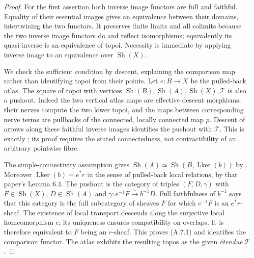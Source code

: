 \begin{proof}
For the first assertion both inverse image functors are full and
faithful. Equality of their essential images gives an equivalence
between their domains, intertwining the two functors. It preserves
finite limits and all colimits because the two inverse image functors
do and reflect isomorphisms; equivalently its quasi-inverse is an
equivalence of topoi. Necessity is immediate by applying inverse
image to an equivalence over $\operatorname{Sh}(X)$.

We check the sufficient condition by descent, explaining the comparison
map rather than identifying topoi from their points. Let $e:B\to X$
be the pulled-back atlas. The square of topoi with vertices
$\operatorname{Sh}(B),\operatorname{Sh}(A),\operatorname{Sh}(X),
\mathcal T$ is also a pushout. Indeed the two vertical atlas maps
are effective descent morphisms; their nerves compute the two lower
topoi, and the maps between corresponding nerve terms are pullbacks
of the connected, locally connected map $p$. Descent of arrows along
these faithful inverse images identifies the pushout with $\mathcal T$.
This is exactly \cite[Lemma 7.2, using Lemma 3.5]{KockMoerdijk1992};
its proof requires the stated connectedness, not contractibility of
an arbitrary pointwise fibre.

The simple-connectivity assumption gives
$\operatorname{Sh}(A)\simeq
\operatorname{Sh}(B,\operatorname{Lker}(b))$ by
\cite[Lemma 5.1]{KockMoerdijk1992}. Moreover
$\operatorname{Lker}(b)=e^*r$ in the sense of pulled-back local
relations, by that paper's Lemma 6.4. The pushout is the category of
triples $(F,D,\gamma)$ with $F\in\operatorname{Sh}(X)$,
$D\in\operatorname{Sh}(A)$ and
$\gamma:e^{-1}F\xrightarrow{\sim}b^{-1}D$.
Full faithfulness of $b^{-1}$ says that this category is the full
subcategory of sheaves $F$ for which $e^{-1}F$ is an $e^*r$-sheaf.
The existence of local transport descends along the surjective local
homeomorphism $e$; its uniqueness ensures compatibility on overlaps.
It is therefore equivalent to $F$ being an $r$-sheaf. This proves
(A.7.1) and identifies the comparison functor. The atlas exhibits the
resulting topos as the given \emph{\'etendue} $\mathcal T$.
\end{proof}

